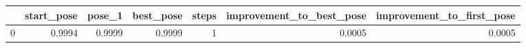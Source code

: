 \begin{tabular}{lrrrrrr}
\toprule
{} &  start\_pose &  pose\_1 &  best\_pose &  steps &  improvement\_to\_best\_pose &  improvement\_to\_first\_pose \\
\midrule
0 &      0.9994 &  0.9999 &     0.9999 &      1 &                    0.0005 &                     0.0005 \\
\bottomrule
\end{tabular}
